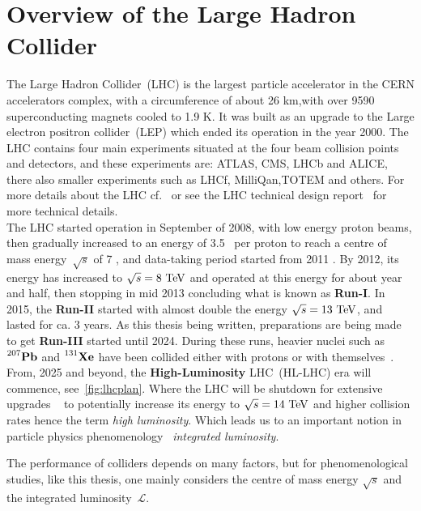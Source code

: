 \section{Overview of the Large Hadron Collider \label{sec:theLHC}}
\par The Large Hadron Collider~(LHC) is the largest particle accelerator in the CERN accelerators complex, with a circumference of about 26 \si{\kilo\metre},with over 9590 superconducting magnets cooled to 1.9 \si{\kelvin}. It was built as an upgrade to the  Large electron positron collider~(LEP) which ended its operation in the year 2000. The LHC contains four main experiments situated at the four beam collision points and detectors, and these experiments are: ATLAS, CMS, LHCb and ALICE, there also smaller experiments such as LHCf, MilliQan,TOTEM and others. For more details about the LHC cf.~\cite{cernfacts,welt-machine} or see the LHC technical design report~\cite{Bruning:2004ej} for more technical details.\\   The LHC started operation in September of 2008, with low energy proton beams, then gradually increased to an energy of 3.5 \TeV\ per proton to reach a centre of mass energy~$\sqrt{s}$ of 7 \TeV, and data-taking period started from 2011 . By 2012, its energy has increased to $\sqrt{s}= 8\ \TeV$ and operated at this energy for about year and half, then stopping in mid 2013 concluding what is known as \textbf{Run-I}. In 2015, the \textbf{Run-II} started with almost double the energy $\sqrt{s}= 13\ \TeV$, and lasted for ca. 3 years. As this thesis being written, preparations are being made to get \textbf{Run-III} started until 2024. During these runs, heavier nuclei such as $\prescript{207}{}{\mathbf{Pb}}$ and $\prescript{131}{}{\mathbf{Xe}}$ have been collided either with protons or with themselves~\cite{lhckomission}.  \\  From, 2025 and beyond, the \textbf{High-Luminosity} LHC~(HL-LHC) era will commence, see~\autoref{fig:lhcplan}.   Where the LHC will be shutdown for extensive upgrades ~\cite{Apollinari:2015bam} to potentially increase its energy to  $\sqrt{s}= 14\ \TeV$ and higher collision rates hence the term \emph{high luminosity}. Which leads us to an important notion in particle physics phenomenology ~\emph{integrated luminosity}.\\
\par The performance of colliders depends on many factors, but for phenomenological studies, like this thesis, one mainly considers the centre of mass energy $\sqrt{s}$ and the integrated luminosity~$\mathscr{L}$.
